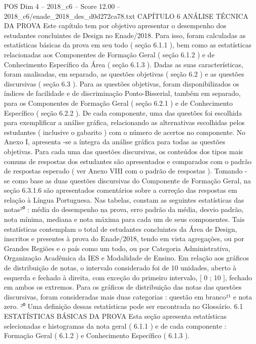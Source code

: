 \begin{textsample}{POS Dim 4 – 2018\_c6 – Score 12.00 – 2018\_c6/enade\_2018\_des\_d0d272ca78.txt}  \label{ex:f4_pos_019}
CAPÍTULO 6 ANÁLISE TÉCNICA DA PROVA Este capítulo tem por objetivo apresentar o desempenho dos estudantes concluintes de Design no Enade/2018.
Para isso, foram calculadas as estatísticas básicas da prova em seu todo ( seção 6.1.1 ), bem como as estatísticas relacionadas aos Componentes de Formação Geral ( seção 6.1.2 ) e de Conhecimento Específico da Área ( seção 6.1.3 ).
Dadas as suas características, foram analisadas, em separado, as questões objetivas ( seção 6.2 ) e as questões discursivas ( seção 6.3 ).
Para as questões objetivas, foram disponibilizados os índices de facilidade e de discriminação Ponto-Bisserial, também em separado, para os Componentes de Formação Geral ( seção 6.2.1 ) e de Conhecimento Específico ( seção 6.2.2 ).
De cada componente, uma das questões foi escolhida para exemplificar a análise gráfica, relacionando as alternativas escolhidas pelos estudantes ( inclusive o gabarito ) com o número de acertos no componente.
No Anexo I, apresenta -se a íntegra da análise gráfica para todas as questões objetivas.
Para cada uma das questões discursivas, os conteúdos dos tipos mais comuns de respostas dos estudantes são apresentados e comparados com o padrão de respostas esperado ( ver Anexo VIII com o padrão de respostas ).
Tomando -se como base as duas questões discursivas do Componente de Formação Geral, na seção 6.3.1.6 são apresentados comentários sobre a correção das respostas em relação à Língua Portuguesa.
Nas tabelas, constam as seguintes estatísticas das notas²⁰ : média do desempenho na prova, erro padrão da média, desvio padrão, nota mínima, mediana e nota máxima para cada um de seus componentes.
Tais estatísticas contemplam o total de estudantes concluintes da Área de Design, inscritos e presentes à prova do Enade/2018, tendo em vista agregações, ou por Grandes Regiões e o país como um todo, ou por Categoria Administrativa, Organização Acadêmica da IES e Modalidade de Ensino.
Em relação aos gráficos de distribuição de notas, o intervalo considerado foi de 10 unidades, aberto à esquerda e fechado à direita, com exceção do primeiro intervalo, [ 0 ; 10 ], fechado em ambos os extremos.
Para os gráficos de distribuição das notas das questões discursivas, foram consideradas mais duas categorias : questão em branco²¹ e nota zero. ²⁰ Uma definição dessas estatísticas pode ser encontrada no Glossário. 6.1 ESTATÍSTICAS BÁSICAS DA PROVA Esta seção apresenta estatísticas selecionadas e histogramas da nota geral ( 6.1.1 ) e de cada componente : Formação Geral ( 6.1.2 ) e Conhecimento Específico ( 6.1.3 ).

\end{textsample}
